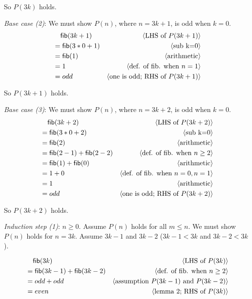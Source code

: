 \documentclass[11pt,fleqn]{article}
\newcommand{\mname}[1]{\mbox{\sf #1}}
\newcommand{\pnote}[1]{{\langle \text{#1} \rangle}}
\begin{document}
\begin{enumerate}
  So $P(3k)$ holds.

  \emph{Base case (2)}: We must show $P(n)$, where $n=3k+1$, is odd when $k=0$.
  \begin{align*}
    &\phantom{{}=} \mname{fib}(3k+1) & \pnote{LHS of $P(3k+1)$}\\
    &= \mname{fib}(3*0+1)  & \pnote{sub k=0}\\
    &= \mname{fib}(1) & \pnote{arithmetic}\\
    &= 1 & \pnote{def. of fib. when $n=1$}\\
    &= odd    & \pnote{one is odd; RHS of $P(3k+1)$}\\
  \end{align*}

  So $P(3k+1)$ holds.

  \emph{Base case (3)}: We must show $P(n)$, where $n=3k+2$, is odd when $k=0$.
  \begin{align*}
    &\phantom{{}=} \mname{fib}(3k+2) & \pnote{LHS of $P(3k+2)$}\\
    &= \mname{fib}(3*0+2)  & \pnote{sub k=0}\\
    &= \mname{fib}(2) & \pnote{arithmetic}\\
    &= \mname{fib}(2-1)+\mname{fib}(2-2) & \pnote{def. of fib. when $n \ge 2$}\\
    &= \mname{fib}(1)+\mname{fib}(0) & \pnote{arithmetic}\\
    &= 1+0 & \pnote{def. of fib. when $n=0, n=1$}\\
    &= 1 & \pnote{arithmetic}\\
    &= odd    & \pnote{one is odd; RHS of $P(3k+2)$}\\
  \end{align*}

  So $P(3k+2)$ holds.

  \medskip

  \emph{Induction step (1)}: $n \ge 0$. Assume $P(n)$ holds for all $m \le n$. We must show $P(n)$ holds for $n=3k$. Assume $3k-1$ and $3k-2$ ($3k-1 < 3k$ and $3k-2 < 3k$).

  \begin{align*}
    &\phantom{{}=} \mname{fib}(3k) & \pnote{LHS of $P(3k)$}\\
    &= \mname{fib}(3k-1)+\mname{fib}(3k-2) & \pnote{def. of fib. when $n \ge 2$}\\
    &= odd + odd   & \pnote{assumption $P(3k-1)$ and $P(3k-2)$}\\
    &= even & \pnote{lemma 2; RHS of $P(3k)$}\\
  \end{align*}


\end{enumerate}
\end{document}

